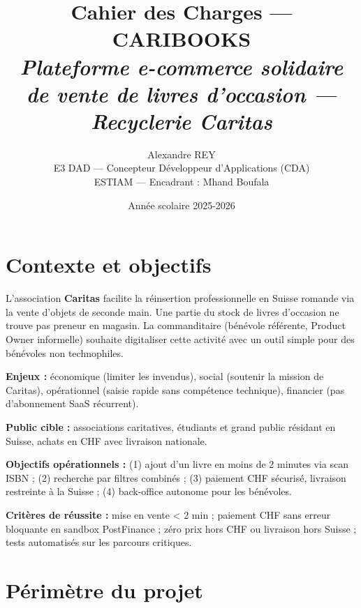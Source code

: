\documentclass[10pt, a4paper]{article}
\title{\textbf{Cahier des Charges — CARIBOOKS}\\[4pt]
\large\textit{Plateforme e-commerce solidaire de vente de livres d'occasion — Recyclerie Caritas}}
\author{Alexandre REY \\ E3 DAD — Concepteur Développeur d'Applications (CDA) \\ ESTIAM — Encadrant : Mhand Boufala}
\date{Année scolaire 2025-2026}
\begin{document}
\maketitle
\thispagestyle{fancy}


\section{Contexte et objectifs}

L'association \textbf{Caritas} facilite la réinsertion professionnelle en Suisse romande via
la vente d'objets de seconde main. Une partie du stock de livres d'occasion ne trouve pas
preneur en magasin. La commanditaire (bénévole référente, Product Owner informelle) souhaite
digitaliser cette activité avec un outil simple pour des bénévoles non technophiles.

\noindent\textbf{Enjeux :} économique (limiter les invendus), social (soutenir la mission de
Caritas), opérationnel (saisie rapide sans compétence technique), financier (pas d'abonnement
SaaS récurrent).

\noindent\textbf{Public cible :} associations caritatives, étudiants et grand public résidant
en Suisse, achats en CHF avec livraison nationale.

\noindent\textbf{Objectifs opérationnels :} (1) ajout d'un livre en moins de 2 minutes via
scan ISBN ; (2) recherche par filtres combinés ; (3) paiement CHF sécurisé, livraison
restreinte à la Suisse ; (4) back-office autonome pour les bénévoles.

\noindent\textbf{Critères de réussite :} mise en vente < 2 min ; paiement CHF sans erreur
bloquante en sandbox PostFinance ; zéro prix hors CHF ou livraison hors Suisse ; tests
automatisés sur les parcours critiques.

\section{Périmètre du projet}
\end{document}
